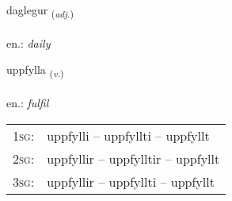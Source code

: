 \documentclass[frontgrid, backgrid]{flacards}\usepackage[]{graphicx}\usepackage[]{xcolor}
\begin{document}
\renewcommand{\flhead}{\vskip5pt \fboxsep=0pt {\small\bfseries\footnotesize Lýsingarorð | Adjective}}
\renewcommand{\fcfoot}{\vskip5pt \fboxsep=0pt \hspace{2pt}{\small\bfseries\footnotesize 2K}}

\renewcommand{\blhead}{\vskip5pt {\small\bfseries\footnotesize Lýsingarorð | Adjective }}
\renewcommand{\bcfoot}{\vskip5pt \hspace{2pt}{\small\bfseries\footnotesize 2K}}


{daglegur \small{\textsubscript{(\textit{adj.})}} \\[1ex] %
\textphonetic{[taɣlɛɣʏr]} \\
en.: \emph{daily} \\  [2ex]
\renewcommand*{\arraystretch}{0.8}
}

\renewcommand{\flhead}{\vskip5pt \fboxsep=0pt {\small\bfseries\footnotesize Sagnorð | Verb}}
\renewcommand{\fcfoot}{\vskip5pt \fboxsep=0pt \hspace{2pt}{\small\bfseries\footnotesize 2K}}

\renewcommand{\blhead}{\vskip5pt {\small\bfseries\footnotesize Sagnorð | Verb }}
\renewcommand{\bcfoot}{\vskip5pt \hspace{2pt}{\small\bfseries\footnotesize 2K}}


{uppfylla \small{\textsubscript{(\textit{v.})}} \\[1ex] %
\textphonetic{[ʏhpfɪtla]} \\
en.: \emph{fulfil} \\  [2ex]
\renewcommand*{\arraystretch}{0.8}
\begin{tabular}{p{1cm}l}
\textsc{1sg}: & uppfylli -- uppfyllti -- uppfyllt \\ 
\textsc{2sg}: & uppfyllir -- uppfylltir -- uppfyllt \\ 
\textsc{3sg}: & uppfyllir -- uppfyllti -- uppfyllt \\ 
\end{tabular}
}
\end{document}
